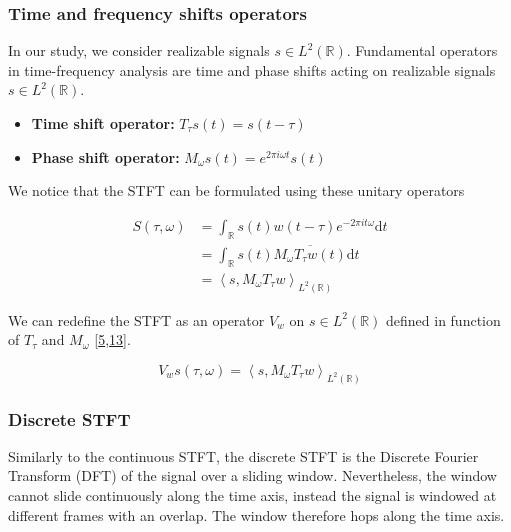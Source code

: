 \documentclass[american,]{article}
\providecommand{\tightlist}{%
  \setlength{\itemsep}{0pt}\setlength{\parskip}{0pt}}
\theoremstyle{definition}
\theoremstyle{definition}
\theoremstyle{definition}
\theoremstyle{remark}
\begin{document}
\hypertarget{time-and-frequency-shifts-operators}{%
\subsubsection{Time and frequency shifts operators}\label{time-and-frequency-shifts-operators}}

In our study, we consider realizable signals \(s\in L^2(\mathbb{R})\).
Fundamental operators in time-frequency analysis are
time and phase shifts acting on realizable signals \(s\in L^2(\mathbb{R})\).

\begin{itemize}
\tightlist
\item
  \textbf{Time shift operator:} \(T_\tau s(t)=s(t-\tau)\)
\item
  \textbf{Phase shift operator:} \(M_\omega s(t)=e^{2\pi i \omega t} s(t)\)
\end{itemize}

We notice that the STFT can be formulated using these unitary operators

\begin{align}
S(\tau,\omega) &= \int_\mathbb{R}s(t)w(t-\tau)e^{-2\pi it\omega} \mathrm{d}t\\
    &= \int_\mathbb{R}s(t) \overline{M_\omega T_\tau w(t)} \mathrm{d}t\\
    &= \left\langle s, M_\omega T_\tau w\right\rangle_{L^2(\mathbb{R})}
\end{align}

We can redefine the STFT as an operator \(V_w\) on \(s\in L^2(\mathbb{R})\)
defined in function of \(T_\tau\) and \(M_\omega\) {[}\protect\hyperlink{ref-boscain2021}{5},\protect\hyperlink{ref-grochenig2001}{13}{]}.

\begin{equation}\label{eq:stft_operator}
V_w s(\tau,\omega) = \left\langle s, M_\omega T_\tau w\right\rangle_{L^2(\mathbb{R})}
\end{equation}

\hypertarget{discrete-stft}{%
\subsubsection{Discrete STFT}\label{discrete-stft}}

Similarly to the continuous STFT, the discrete STFT is the
Discrete Fourier Transform (DFT) of the signal over a sliding window.
Nevertheless, the window cannot slide continuously along the time axis,
instead the signal is windowed at different frames with an overlap.
The window therefore hops along the time axis.
\end{document}
